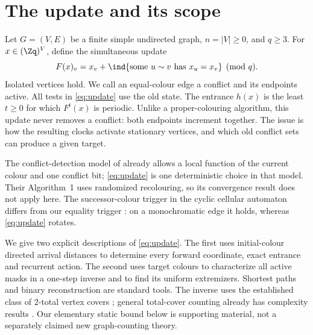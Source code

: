 \section{The update and its scope}
Let $G=(V,E)$ be a finite simple undirected graph, $n=|V|\ge0$, and
$q\ge3$. For $x\in(\Zq)^V$, define the simultaneous update
\begin{equation}\label{eq:update}
 F(x)_v=x_v+\ind\{\text{some }u\sim v\text{ has }x_u=x_v\}\pmod q.
\end{equation}
Isolated vertices hold. We call an equal-colour edge a conflict and its
endpoints active. All tests in \eqref{eq:update} use the old state.
The entrance $h(x)$ is the least $t\ge0$ for which $F^t(x)$ is periodic.
Unlike a proper-colouring algorithm, this update never removes a conflict:
both endpoints increment together. The issue is how the resulting clocks
activate stationary vertices, and which old conflict sets can produce a
given target.

The conflict-detection model of \citet[Section II-A]{motskin2009lightweight}
already allows a local function of the current colour and one conflict bit;
\eqref{eq:update} is one deterministic choice in that model. Their
Algorithm~1 uses randomized recolouring, so its convergence result does
not apply here. The successor-colour
trigger in the cyclic cellular automaton differs from our equality trigger
\citep[Section 1]{gravner2018limiting}: on a monochromatic edge it holds,
whereas \eqref{eq:update} rotates.

We give two explicit descriptions of \eqref{eq:update}. The first uses
initial-colour directed arrival distances to determine every forward
coordinate, exact entrance and recurrent action. The second uses target
colours to characterize all active masks in a one-step inverse and to find
its uniform extremizers. Shortest paths and binary reconstruction are
standard tools. The inverse uses the established class of $2$-total vertex
covers \citep{fernau2015cover}; general total-cover counting already has
complexity results \citep[Corollary 2.5]{molinero2018satisfaction}.
Our elementary static bound below is supporting material, not a separately
claimed new graph-counting theory.
